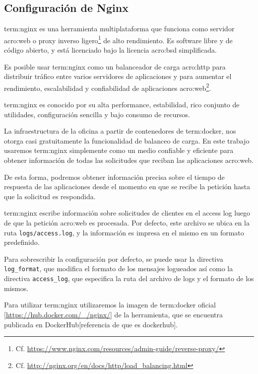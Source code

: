 \subsection{Configuración de Nginx} \label{configuracion_de_nginx}

\gls{term:nginx} es una herramienta multiplataforma que funciona como servidor
\gls{acro:web} o proxy inverso ligero\footnote{Cf.
\url{https://www.nginx.com/resources/admin-guide/reverse-proxy/}} de alto
rendimiento. Es software libre y de código abierto, y está licenciado bajo la
licencia \gls{acro:bsd} simplificada.

Es posible usar \gls{term:nginx} como un balanceador de carga \gls{acro:http}
para distribuir tráfico entre varios servidores de aplicaciones y para aumentar
el rendimiento, escalabilidad y confiabilidad de aplicaciones
\gls{acro:web}\footnote{Cf.
\url{http://nginx.org/en/docs/http/load_balancing.html}}.

\gls{term:nginx} es conocido por su alta performance, estabilidad, rico
conjunto de utilidades, configuración sencilla y bajo consumo de recursos.

La infraestructura de la oficina a partir de contenedores de \gls{term:docker},
nos otorga casi gratuitamente la funcionalidad de balanceo de carga. En este
trabajo usaremos \gls{term:nginx} simplemente como un medio confiable y
eficiente para obtener información de todas las solicitudes que reciban las
aplicaciones \gls{acro:web}.

De esta forma, podremos obtener información precisa sobre el tiempo de
respuesta de las aplicaciones desde el momento en que se recibe la petición
hasta que la solicitud es respondida.

\gls{term:nginx} escribe información sobre solicitudes de clientes en el access
log luego de que la petición \gls{acro:web} es procesada. Por defecto, este
archivo se ubica en la ruta \texttt{logs/access.log}, y la información es
impresa en el mismo en un formato predefinido.

Para sobrescribir la configuración por defecto, se puede usar la directiva
\texttt{log\_format}, que modifica el formato de los mensajes logueados así
como la directiva \texttt{access\_log}, que especifica la ruta del archivo de
logs y el formato de los mismos.

Para utilizar \gls{term:nginx} utilizaremos la imagen de \gls{term:docker}
oficial [\url{https://hub.docker.com/_/nginx/}] de la herramienta, que se
encuentra publicada en DockerHub[referencia de que es dockerhub].

